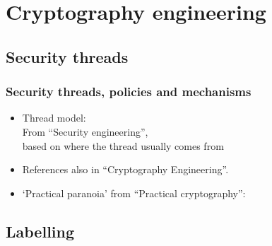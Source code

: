 \documentclass{beamer}
\begin{document}
\section{Cryptography engineering}

\subsection{Security threads}

\begin{frame}
\frametitle{Security threads, policies and mechanisms}
    \begin{itemize}
        \item Thread model:\\From ``Security engineering''\cite{SecEngRossAnderson},\\based on where the thread usually comes from
        \item<3-> References also in ``Cryptography Engineering''\cite{cryptoEngineering}.
        \item<4-> `Practical paranoia' from ``Practical cryptography''\cite{PractCryptoSchneier}:
    \end{itemize}
\end{frame}

\subsection{Labelling}
\end{document}
